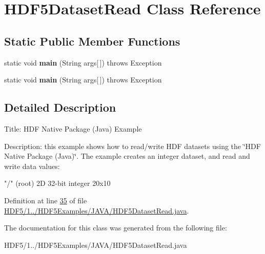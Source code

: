 \hypertarget{class_h_d_f5_dataset_read}{}\section{H\+D\+F5\+Dataset\+Read Class Reference}
\label{class_h_d_f5_dataset_read}
\subsection*{Static Public Member Functions}
\begin{DoxyCompactItemize}
\item 
\mbox{\label{class_h_d_f5_dataset_read_a58d7223a4810e19267b3e6ba521b3264}} 
static void {\bfseries main} (String args\mbox{[}$\,$\mbox{]})  throws Exception 
\item 
\mbox{\label{class_h_d_f5_dataset_read_a58d7223a4810e19267b3e6ba521b3264}} 
static void {\bfseries main} (String args\mbox{[}$\,$\mbox{]})  throws Exception 
\end{DoxyCompactItemize}


\subsection{Detailed Description}
Title\+: H\+DF Native Package (Java) Example 

Description\+: this example shows how to read/write H\+DF datasets using the \char`\"{}\+H\+D\+F Native Package (\+Java)\char`\"{}. The example creates an integer dataset, and read and write data values\+:


\begin{DoxyPre}
    "/" (root)
            2D 32-bit integer 20x10
\end{DoxyPre}


Definition at line \hyperlink{_h_d_f5_21_810_81_2_h_d_f5_examples_2_j_a_v_a_2_h_d_f5_dataset_read_8java_source_l00035}{35} of file \hyperlink{_h_d_f5_21_810_81_2_h_d_f5_examples_2_j_a_v_a_2_h_d_f5_dataset_read_8java_source}{H\+D\+F5/1../\+H\+D\+F5\+Examples/\+J\+A\+V\+A/\+H\+D\+F5\+Dataset\+Read.\+java}.



The documentation for this class was generated from the following file\+:\begin{DoxyCompactItemize}
\item 
H\+D\+F5/1../\+H\+D\+F5\+Examples/\+J\+A\+V\+A/\+H\+D\+F5\+Dataset\+Read.\+java\end{DoxyCompactItemize}
